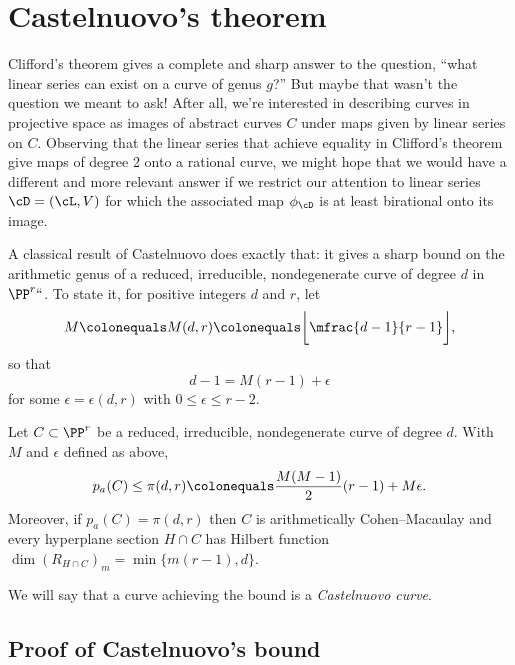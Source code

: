  \section{Castelnuovo's theorem}\label{CastelnuovoSection}

Clifford's theorem gives a complete and sharp answer to the question,
%
``what linear series can exist on a curve of genus $g$?''
But maybe that wasn't the question we meant to ask! After all, we're
interested in describing curves in projective space as images of abstract
curves $C$ under maps given by linear series on $C$. Observing that
the linear series that achieve equality in
Clifford's theorem
%
give maps of degree 2 onto a rational curve,
 we might hope that we
would have a
 different and more relevant
answer if we
restrict our attention to linear series $\cD = (\cL,V)$ for which the
%
associated map $\phi_\cD$ is at least  birational onto its image.

A classical result of Castelnuovo does exactly that: it gives a sharp
bound on the
arithmetic genus
%
of a reduced, irreducible, nondegenerate
curve of degree $d$ in $\PP^r` `$. To state it, for positive integers $d$
and $r$, let
%
\label{def of M}
$$
 M \colonequals
M(d,r)
\colonequals
\biggl\lfloor\mfrac{d-1}{r-1}\biggr\rfloor,
$$
so that
$$
 d -1 = M(r-1) + \epsilon
$$
for some $\epsilon =
\epsilon(d,r)
$
 with $0 \leq \epsilon \leq r-2$.
%

\begin{theorem}\label{Castelnuovo's bound}
Let $C \subset \PP^r$ be a reduced, irreducible, nondegenerate curve of
%
degree $d$. With $M$ and $\epsilon$ defined
as above,
$$
p_a(C) \leq \pi(d,r) \colonequals  \frac{M(M-1)}{2}(r-1) + M\epsilon.
$$
Moreover, if $p_a(C) = \pi(d,r)$  then $C$ is arithmetically
%
Cohen--Macaulay and every hyperplane
section $H\cap C$ has
Hilbert function
%
$
\dim (R_{H\cap C})_{m} = \min\{m(r-1), d\}.
$
\end{theorem}

We will say that a curve achieving the bound is a \emph{Castelnuovo
%
curve}.

\subsection*{Proof of Castelnuovo's bound}

